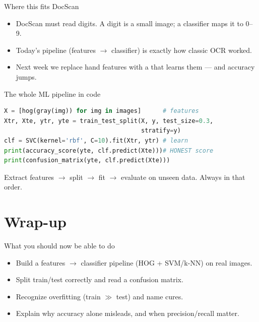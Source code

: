 \documentclass[10pt,aspectratio=169]{beamer}
\begin{document}
\begin{frame}{Where this fits DocScan}
  \begin{itemize}
    \item DocScan must read digits. A digit is a small image; a classifier maps it to 0--9.
    \item Today's pipeline (features $\rightarrow$ classifier) is exactly how classic OCR worked.
    \item Next week we replace hand features with a  that learns them — and accuracy jumps.
  \end{itemize}
\end{frame}

\begin{frame}[fragile]{The whole ML pipeline in code}
\begin{lstlisting}[language=Python]
X = [hog(gray(img)) for img in images]      # features
Xtr, Xte, ytr, yte = train_test_split(X, y, test_size=0.3,
                                      stratify=y)
clf = SVC(kernel='rbf', C=10).fit(Xtr, ytr) # learn
print(accuracy_score(yte, clf.predict(Xte)))# HONEST score
print(confusion_matrix(yte, clf.predict(Xte)))
\end{lstlisting}
  Extract features $\rightarrow$ split $\rightarrow$ fit $\rightarrow$ evaluate on unseen data. Always in that order.
\end{frame}

\section{Wrap-up}

\begin{frame}{What you should now be able to do}
  \begin{itemize}
    \item Build a features $\rightarrow$ classifier pipeline (HOG + SVM/k-NN) on real images.
    \item Split train/test correctly and read a confusion matrix.
    \item Recognize overfitting (train $\gg$ test) and name cures.
    \item Explain why accuracy alone misleads, and when precision/recall matter.
  \end{itemize}
\end{frame}
\end{document}
